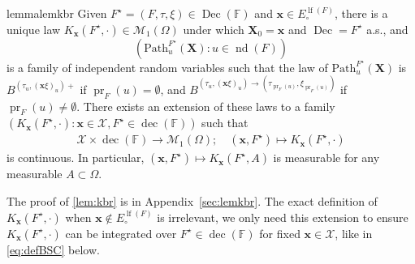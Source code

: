 \documentclass[reqno,draft]{amsart}
\numberwithin{equation}{section}
\theoremstyle{plain}
\newtheorem{lemma}[theorem]{Lemma}
\theoremstyle{remark}
\newcommand*\diff{\mathop{}\!\mathrm{d}}
\DeclareMathOperator{\dom}{dom}
\DeclareMathOperator{\pr}{pr}
\DeclareMathOperator{\lf}{lf}
\DeclareMathOperator{\nd}{nd}
\DeclareMathOperator{\dcb}{dec}
\newcommand{\kbr}{K} %
\DeclareMathOperator{\dc}{Dec}
\newcommand{\pth}{\mathrm{Path}}
\begin{document}
\begin{restatable}{lemma}{lemkbr}\label{lem:kbr}
    Given $F^\star = (F,\tau,\xi) \in \dc(\mathbb{F})$ and $\boldsymbol x \in E_\circ ^{\lf(F)}$, there is a unique law $\kbr_{\boldsymbol x}(F^\star,\cdot )\in \mathcal{M}_1(\Omega)$ under which $\boldsymbol X_0 = \boldsymbol x$ and $\dc = F^\star$ a.s., and \[
    \left( \pth^{F^\star}_u(\boldsymbol X)\colon u\in \nd(F) \right)
\] is a family of independent random variables such that the law of $\pth^{F^\star}_u(\boldsymbol X)$ is $B^{(\tau_u,(\boldsymbol x\xi)_u)+}$ if $\pr_F(u) = \emptyset $, and $B^{(\tau_u,(\boldsymbol x\xi)_u)\to(\tau_{\pr_F(u)},\xi_{\pr_F(u)})}$ if $\pr_F(u) \neq \emptyset $.
    There exists an extension of these laws to a family $(\kbr_{\boldsymbol x}(F^\star,\cdot )\colon \boldsymbol x\in \mathcal{X},F^\star \in \dcb(\mathbb{F}))$ such that
    \begin{align*}
        \mathcal{X}\times \dcb(\mathbb{F}) \to \mathcal{M}_1(\Omega);\quad (\boldsymbol x,F^\star) \mapsto \kbr_{\boldsymbol x}(F^\star,\cdot )
    \end{align*}
    is continuous. In particular, $(\boldsymbol x,F^\star) \mapsto \kbr_{\boldsymbol x}(F^\star,A)$ is measurable for any measurable $A\subset \Omega$.
\end{restatable}
The proof of \cref{lem:kbr} is in Appendix~\ref{sec:lemkbr}. The exact definition of $\kbr_{\boldsymbol x}(F^\star,\cdot )$ when $\boldsymbol x \not\in E^{\lf(F)}_\circ $ is irrelevant, we only need this extension to ensure $K_{\boldsymbol x}(F^\star,\cdot )$ can be integrated over $F^\star \in \dcb(\mathbb{F})$ for fixed $\boldsymbol x\in \mathcal{X}$, like in \cref{eq:defBSC} below.
\end{document}
